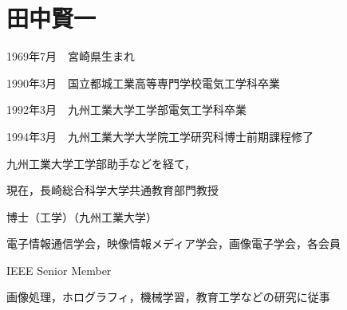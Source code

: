 \documentclass[dvipdfmx,%
  tombo,%
  paper=b5,%
]{kddbook}
\begin{document}
\section*{田中賢一}

1969年7月　宮崎県生まれ

1990年3月　国立都城工業高等専門学校電気工学科卒業

1992年3月　九州工業大学工学部電気工学科卒業

1994年3月　九州工業大学大学院工学研究科博士前期課程修了

九州工業大学工学部助手などを経て，

現在，長崎総合科学大学共通教育部門教授

博士（工学）（九州工業大学）

電子情報通信学会，映像情報メディア学会，画像電子学会，各会員

IEEE Senior Member

画像処理，ホログラフィ，機械学習，教育工学などの研究に従事



\appendix%
\end{document}
